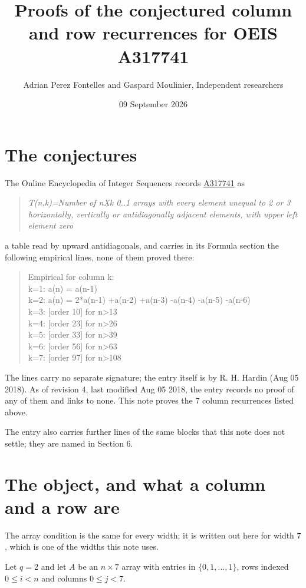 \documentclass[11pt]{article}
\title{Proofs of the conjectured column and row recurrences for OEIS A317741}
\author{Adrian Perez Fontelles and Gaspard Moulinier, Independent researchers}
\date{09 September 2026}
\theoremstyle{definition}
\begin{document}
\maketitle
\section{The conjectures}

The Online Encyclopedia of Integer Sequences records \href{https://oeis.org/A317741}{A317741} as

\begin{quote}\itshape T(n,k)=Number of nXk 0..1 arrays with every element unequal to 2 or 3 horizontally, vertically or antidiagonally adjacent elements, with upper left element zero\end{quote}

a table read by upward antidiagonals, and carries in its Formula section the following empirical lines, none of them proved there:

\begin{quote}\ttfamily Empirical for column k:\\
k=1: a(n) = a(n-1)\\k=2: a(n) = 2*a(n-1) +a(n-2) +a(n-3) -a(n-4) -a(n-5) -a(n-6)\\k=3: [order 10] for n>13\\k=4: [order 23] for n>26\\k=5: [order 33] for n>39\\k=6: [order 56] for n>63\\k=7: [order 97] for n>108\end{quote}

The lines carry no separate signature; the entry itself is by R. H. Hardin (Aug 05 2018). As of revision 4, last modified Aug 05 2018, the entry records no proof of any of them and links to none. This note proves the 7 column recurrences listed above.

The entry also carries further lines of the same blocks that this note does not settle; they are named in Section 6.

\section{The object, and what a column and a row are}

The array condition is the same for every width; it is written out here for width $7$, which is one of the widths this note uses.

Let $q = 2$ and let $A$ be an $n \times 7$ array with entries in $\{0,1,\dots,1\}$, rows indexed $0 \le i < n$ and columns $0 \le j < 7$.
\end{document}
